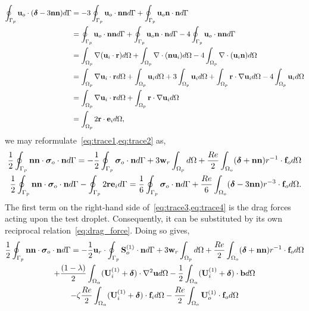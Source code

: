 \begin{align*}
    \intS[p]{\textbf{u}_{o} \cdot (\bm\delta - 3\textbf{nn})}
    &=
    - 3 \intS[p]{\textbf{u}_{o}\cdot \textbf{nn}}
    + \intS[p]{\textbf{u}_{o} \textbf{n}\cdot \textbf{n}}\\
    &=
    \intS[p]{\textbf{u}_{o}\cdot \textbf{nn}}
    + \intS[p]{\textbf{u}_{o} \textbf{n}\cdot \textbf{n}}
    - 4 \intS[p]{\textbf{u}_{o}\cdot \textbf{nn}}\\
    &=
    \intO[p]{\grad (\textbf{u}_{i}\cdot \textbf{r})}
    + \intO[p]{\div(\textbf{n}\textbf{u}_{i})}
    - 4 \intO[p]{\div (\textbf{u}_{i}\textbf{n})}\\
    &=
    \intO[p]{\grad \textbf{u}_{i}\cdot \textbf{r}}
    + \intO[p]{\textbf{u}_{i}}
    + 3\intO[p]{\textbf{u}_{i}}
    + \intO[p]{\textbf{r}\cdot \grad\textbf{u}_{i}}
    - 4 \intO[p]{\textbf{u}_{i} }\\
    &=
    \intO[p]{\grad \textbf{u}_{i}\cdot \textbf{r}}
    + \intO[p]{\textbf{r}\cdot \grad\textbf{u}_{i}}
    \\
    &=
    \intO[p]{2 \textbf{r}\cdot \textbf{e}_i},
    \\
\end{align*}
we may reformulate~\ref{eq:trace1,eq:trace2} as,
\begin{align}
    \frac{1}{2}\intS[p]{\textbf{nn} \cdot  \bm\sigma_{o}\cdot \textbf{n}}
    =
    - \frac{1}{2}\intS[p]{ \bm\sigma_{o}\cdot \textbf{n}}
    + 3\textbf{w}_r \intO[p]{}
    + \frac{Re}{2}\intO[o]{(\bm\delta + \textbf{nn})r^{-1}\cdot \textbf{f}_{o}}
    \label{eq:trace3}
    \\
    \frac{1}{2}\intS[p]{\textbf{nn} \cdot  \bm\sigma_{o}\cdot \textbf{n}}
    - \intS[p]{2 \textbf{r}\textbf{e}_i}
    =
    \frac{1}{6}\intS[p]{\bm\sigma_{o}\cdot \textbf{n}}
    + 
    \frac{Re}{6}\intO[o]{(\bm\delta - 3\textbf{nn})r^{-3}\cdot \textbf{f}_{o}}.
    \label{eq:trace4}
\end{align}
The first term on the right-hand side of~\ref{eq:trace3,eq:trace4} is the drag forces acting upon the test droplet. 
Consequently, it can be substituted by its own reciprocal relation~\eqref{eq:drag_force}. Doing so gives, 
\begin{multline}
    \frac{1}{2}\intS[p]{\textbf{nn} \cdot  \bm\sigma_{o}\cdot \textbf{n}}
    =
    - \frac{1}{2}
    \textbf{u}_{r}\cdot  \intS[p]{\textbf{S}_{o}^{(1)}\cdot \textbf{n}}
    + 3\textbf{w}_r \intO[p]{}+ \frac{Re}{2}\intO[o]{(\bm\delta + \textbf{nn})r^{-1}\cdot \textbf{f}_{o}}\\
    + \frac{(1-\lambda) }{2} \intO{(\textbf{U}_{i}^{(1)} + \bm\delta)\cdot \grad^2\textbf{u}} 
    - \frac{1}{2} \intO{(\textbf{U}_{i}^{(1)} + \bm\delta)\cdot \textbf{b}} \\
    - \zeta \frac{Re}{2} \intO{(\textbf{U}_{i}^{(1)} + \bm\delta)\cdot \textbf{f}_{i}} 
    - \frac{Re}{2}\intO[o]{\textbf{U}_{o}^{(1)}\cdot \textbf{f}_{o}}\\
    \label{eq:traceIJ}
\end{multline}
